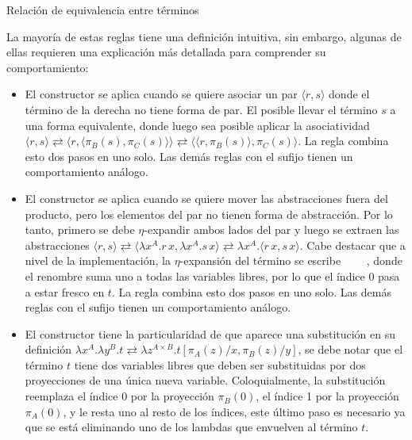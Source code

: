 \begin{codigo}
	Relación de equivalencia entre términos
	
\end{codigo}

La mayoría de estas reglas tiene una definición intuitiva, sin embargo, algunas de ellas requieren una explicación más detallada para comprender su comportamiento:
\begin{itemize}
	\item El constructor  se aplica cuando se quiere asociar un par $\langle r, s \rangle$ donde el término de la derecha no tiene forma de par.
	El posible llevar el término $s$ a una forma equivalente, donde luego sea posible aplicar la asociatividad $\langle r, s \rangle \rightleftarrows \langle r, \langle \pi_B(s), \pi_C(s) \rangle \rangle \rightleftarrows \langle \langle r, \pi_B(s) \rangle, \pi_C(s) \rangle$.
	La regla  combina esto dos pasos en uno solo.
	Las demás reglas con el sufijo  tienen un comportamiento análogo.
	
	\item El constructor  se aplica cuando se quiere mover las abstracciones fuera del producto, pero los elementos del par no tienen forma de abstracción.
	Por lo tanto, primero se debe $\eta$-expandir ambos lados del par y luego se extraen las abstracciones
	$\langle r, s \rangle \rightleftarrows \langle \lambda x^A.r\, x, \lambda x^A.s\, x \rangle \rightleftarrows \lambda x^A. \langle r\, x, s\, x \rangle$.
	Cabe destacar que a nivel de la implementación, la $\eta$-expansión del término  se escribe ~~~~, donde el renombre suma uno a todas las variables libres, por lo que el índice 0 pasa a estar fresco en $t$.
	La regla  combina esto dos pasos en uno solo.
	Las demás reglas con el sufijo  tienen un comportamiento análogo.
	
	\item El constructor  tiene la particularidad de que aparece una substitución en su definición $\lambda x^A. \lambda y^B. t \rightleftarrows \lambda z^{A \times B}. t[\pi_A(z)/x, \pi_B(z)/y]$, se debe notar que el término $t$ tiene dos variables libres que deben ser substituidas por dos proyecciones de una única nueva variable.
	Coloquialmente, la substitución  reemplaza el índice 0 por la proyección $\pi_B(0)$, el índice 1 por la proyección $\pi_A(0)$, y le resta uno al resto de los índices, este último paso es necesario ya que se está eliminando uno de los lambdas que envuelven al término $t$.
	

\end{itemize}
